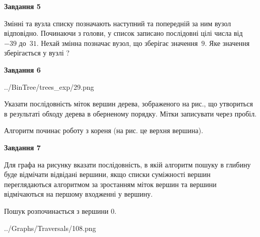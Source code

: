 \documentclass[12pt, ukrainian]{article}
\begin{document}
{\begin {large}
{\begin {center}\textbf{Завдання 5}\end {center}}\par
Змінні  та  вузла списку позначають наступний та попередній за ним вузол відповідно. Починаючи з голови, у список записано послідовні цілі числа від~$-39$ до~$31$. Нехай змінна  позначає вузол, що зберігає значення~$9$.
Яке значення зберігається у вузлі  ?\par
\newpage

{\begin {center}\textbf{Завдання 6}\end {center}}\par

\begin{center}
	{../BinTree/trees_exp/29.png}
\end{center}
Указати послідовність міток вершин дерева, зображеного на рис., що утвориться в результаті обходу дерева в оберненому порядку. Мітки записувати через пробіл.\par Алгоритм починає роботу з кореня (на рис. це верхня вершина).\par
\newpage

{\begin {center}\textbf{Завдання 7}\end {center}}\par
Для графа на рисунку вказати послідовність, в якій алгоритм пошуку в глибину буде відмічати відвідані вершини, якщо списки суміжності вершин переглядаються алгоритмом за зростанням міток вершин та вершини відмічаються на першому вход\-женні у вершину.\par
Пошук розпочинається з вершини 0.\par

\begin{center}
	{../Graphs/Traversals/108.png}
\end{center}\par
\newpage


\end{large}}
\end{document}
